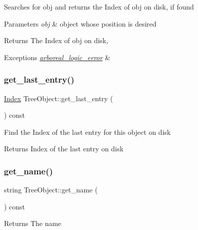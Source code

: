 Searches for obj and returns the Index of obj on disk, if found 
\begin{DoxyParams}{Parameters}
{\em obj} & object whose position is desired \\
\hline
\end{DoxyParams}
\begin{DoxyReturn}{Returns}
The Index of obj on disk, 
\end{DoxyReturn}

\begin{DoxyExceptions}{Exceptions}
{\em \mbox{\hyperlink{classarboreal__logic__error}{arboreal\+\_\+logic\+\_\+error}}} & \\
\hline
\end{DoxyExceptions}
\mbox{\label{classTreeObject_a2d7c1a4c2d36c81110ccae09d9724125}} 
\subsubsection{\texorpdfstring{get\+\_\+last\+\_\+entry()}{get\_last\_entry()}}
{\footnotesize\ttfamily \mbox{\hyperlink{structindex}{Index}} Tree\+Object\+::get\+\_\+last\+\_\+entry (\begin{DoxyParamCaption}{ }\end{DoxyParamCaption}) const}

Find the Index of the last entry for this object on disk \begin{DoxyReturn}{Returns}
Index of the last entry on disk 
\end{DoxyReturn}
\mbox{\label{classTreeObject_a5216922ec0b98bcc375601db8d253770}} 
\subsubsection{\texorpdfstring{get\+\_\+name()}{get\_name()}}
{\footnotesize\ttfamily string Tree\+Object\+::get\+\_\+name (\begin{DoxyParamCaption}{ }\end{DoxyParamCaption}) const}

\begin{DoxyReturn}{Returns}
The name 
\end{DoxyReturn}
\mbox{\label{classTreeObject_a16153734dbee4adc99fa195715728c2f}} 

